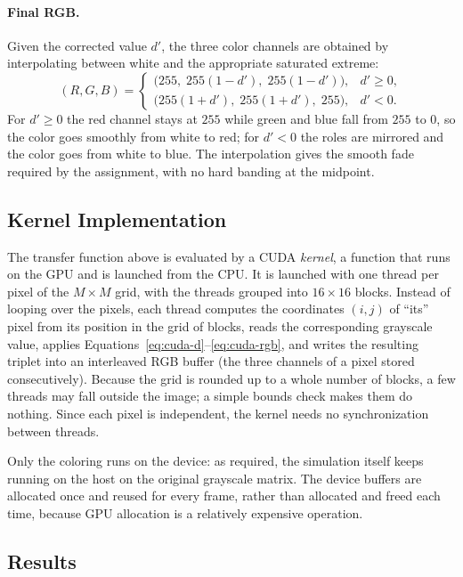 \paragraph{Final RGB.}
Given the corrected value $d'$, the three color channels are obtained by
interpolating between white and the appropriate saturated extreme:
\begin{equation}
    (R,G,B) =
    \begin{cases}
      \bigl(255,\; 255(1-d'),\; 255(1-d')\bigr), & d' \ge 0,\\[4pt]
      \bigl(255(1+d'),\; 255(1+d'),\; 255\bigr), & d' < 0.
    \end{cases}
    \label{eq:cuda-rgb}
\end{equation}
For $d'\ge 0$ the red channel stays at $255$ while green and blue fall from $255$
to $0$, so the color goes smoothly from white to red; for $d'<0$ the roles are
mirrored and the color goes from white to blue. The interpolation gives the
smooth fade required by the assignment, with no hard banding at the midpoint.

\subsection{Kernel Implementation}
\label{sec:cuda-kernel}

The transfer function above is evaluated by a CUDA \emph{kernel}, a function that
runs on the GPU and is launched from the CPU. It is launched with one thread per
pixel of the $M\times M$ grid, with the threads grouped into $16\times16$ blocks.
Instead of looping over the pixels, each thread computes the coordinates $(i,j)$
of ``its'' pixel from its position in the grid of blocks, reads the corresponding
grayscale value, applies Equations~\eqref{eq:cuda-d}--\eqref{eq:cuda-rgb}, and
writes the resulting triplet into an interleaved RGB buffer (the three channels
of a pixel stored consecutively). Because the grid is rounded up to a whole
number of blocks, a few threads may fall outside the image; a simple bounds check
makes them do nothing. Since each pixel is independent, the kernel needs no
synchronization between threads.

Only the coloring runs on the device: as required, the simulation itself keeps
running on the host on the original grayscale matrix. The device buffers are
allocated once and reused for every frame, rather than allocated and freed each
time, because GPU allocation is a relatively expensive operation.

\subsection{Results}
\label{sec:cuda-results}

